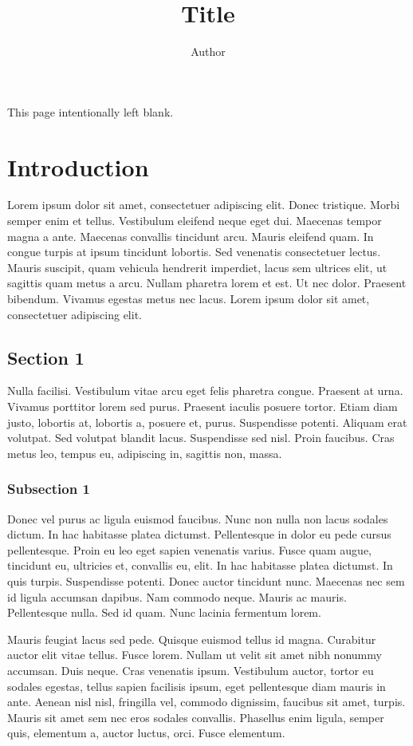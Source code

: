 \documentclass[a4paper,11pt,oneside]{report}
\title{Title}
\author{Author}
\begin{document}
\maketitle
\clearpage
This page intentionally left blank.
\clearpage
\tableofcontents



\chapter{Introduction}
Lorem ipsum dolor sit amet, consectetuer adipiscing elit. Donec tristique. Morbi
semper enim et tellus. Vestibulum eleifend neque eget dui. Maecenas tempor magna
a ante. Maecenas convallis tincidunt arcu. Mauris eleifend quam. In congue
turpis at ipsum tincidunt lobortis. Sed venenatis consectetuer lectus. Mauris
suscipit, quam vehicula hendrerit imperdiet, lacus sem ultrices elit, ut
sagittis quam metus a arcu. Nullam pharetra lorem et est. Ut nec dolor. Praesent
bibendum. Vivamus egestas metus nec lacus. Lorem ipsum dolor sit amet,
consectetuer adipiscing elit.

\section{Section 1}

Nulla facilisi. Vestibulum vitae arcu eget felis pharetra congue. Praesent at
urna. Vivamus porttitor lorem sed purus. Praesent iaculis posuere tortor. Etiam
diam justo, lobortis at, lobortis a, posuere et, purus. Suspendisse potenti.
Aliquam erat volutpat. Sed volutpat blandit lacus. Suspendisse sed nisl. Proin
faucibus. Cras metus leo, tempus eu, adipiscing in, sagittis non, massa.
\subsection{Subsection 1}
Donec vel purus ac ligula euismod faucibus. Nunc non nulla non lacus sodales
dictum. In hac habitasse platea dictumst. Pellentesque in dolor eu pede cursus
pellentesque. Proin eu leo eget sapien venenatis varius. Fusce quam augue,
tincidunt eu, ultricies et, convallis eu, elit. In hac habitasse platea
dictumst. In quis turpis. Suspendisse potenti. Donec auctor tincidunt nunc.
Maecenas nec sem id ligula accumsan dapibus. Nam commodo neque. Mauris ac
mauris. Pellentesque nulla. Sed id quam. Nunc lacinia fermentum lorem.

Mauris feugiat lacus sed pede. Quisque euismod tellus id magna. Curabitur auctor
elit vitae tellus. Fusce lorem. Nullam ut velit sit amet nibh nonummy accumsan.
Duis neque. Cras venenatis ipsum. Vestibulum auctor, tortor eu sodales egestas,
tellus sapien facilisis ipsum, eget pellentesque diam mauris in ante. Aenean
nisl nisl, fringilla vel, commodo dignissim, faucibus sit amet, turpis. Mauris
sit amet sem nec eros sodales convallis. Phasellus enim ligula, semper quis,
elementum a, auctor luctus, orci. Fusce elementum.
\end{document}
